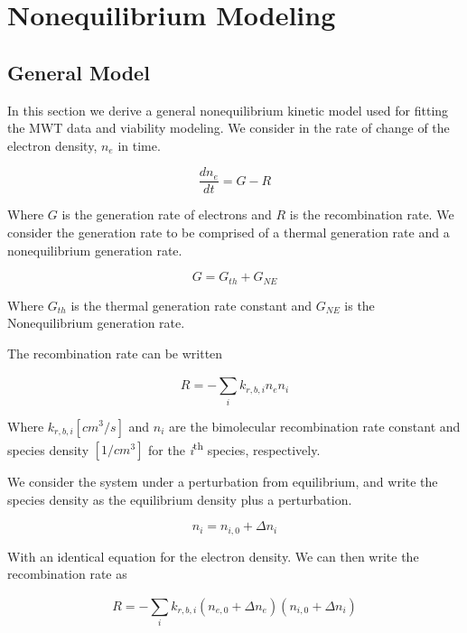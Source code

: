 \section{Nonequilibrium Modeling}

\subsection{General Model}

In this section we derive a general nonequilibrium kinetic model used for fitting the MWT data and viability modeling. We consider in the rate of change of the electron density, \(n_{e}\) in time. 

\begin{equation}
  \label{eq:start_deqn}
\frac{dn_{e}}{dt} = G - R
\end{equation}

Where \(G\) is the generation rate of electrons and \(R\) is the recombination rate. We consider the generation rate to be comprised of a thermal generation rate and a nonequilibrium generation rate.

\begin{equation}
  G = G_{th} + G_{NE}
\end{equation}

Where \(G_{th}\) is the thermal generation rate constant and \(G_{NE}\) is the Nonequilibrium generation rate. 

The recombination rate can be written

\begin{equation}
  R = - \sum_{i}^{}k_{r, b, i}n_{e}n_{i}
\end{equation}

Where $k_{r, b, i} [cm^3/s]$  and $n_i$ are the bimolecular recombination rate constant and species density $[1/cm^3]$ for the \emph{i}\textsuperscript{th} species, respectively. 

We consider the system under a perturbation from equilibrium, and write the species density as the equilibrium density plus a perturbation.

\begin{equation}
  n_{i} = n_{i,0} + \Delta n_{i}
\end{equation}

With an identical equation for the electron density. We can then write the recombination rate as

\begin{equation}
  R = - \sum_{i}^{}k_{r, b, i}(n_{e,0} + \Delta n_{e})(n_{i,0} + \Delta n_{i})
\end{equation}

